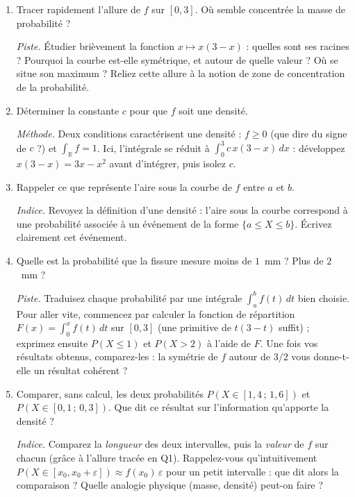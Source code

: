 \begin{enumerate}
  \item Tracer rapidement l'allure de $f$ sur $[0,3]$.
  Où semble concentrée la masse de probabilité ?
  \begin{solution}
    \textit{Piste.} Étudier brièvement la fonction $x\mapsto x(3-x)$ :
    quelles sont ses racines ? Pourquoi la courbe est-elle symétrique,
    et autour de quelle valeur ? Où se situe son maximum ?
    Reliez cette allure à la notion de \og zone de concentration \fg{}
    de la probabilité.
  \end{solution}

  \item Déterminer la constante $c$ pour que $f$ soit une densité.
  \begin{solution}
    \textit{Méthode.} Deux conditions caractérisent une densité :
    $f\ge 0$ (que dire du signe de $c$ ?) et
    $\int_{\mathbb R}f=1$. Ici, l'intégrale se réduit à
    $\int_0^3 c\,x(3-x)\,dx$ : développez $x(3-x)=3x-x^2$ avant
    d'intégrer, puis isolez $c$.
  \end{solution}

  \item Rappeler ce que représente l'aire sous
  la courbe de $f$ entre $a$ et $b$.
  \begin{solution}
    \textit{Indice.} Revoyez la définition d'une densité : l'aire
    sous la courbe correspond à une probabilité associée à un
    événement de la forme $\{a\le X\le b\}$. Écrivez clairement
    cet événement.
  \end{solution}

  \item Quelle est la probabilité que la fissure mesure moins
  de $1$~mm ? Plus de $2$~mm ?
  \begin{solution}
    \textit{Piste.} Traduisez chaque probabilité par une intégrale
    $\int_a^b f(t)\,dt$ bien choisie. Pour aller vite, commencez
    par calculer la fonction de répartition
    $F(x)=\int_0^x f(t)\,dt$ sur $[0,3]$ (une primitive de
    $t(3-t)$ suffit) ; exprimez ensuite $P(X\le 1)$ et $P(X>2)$
    à l'aide de $F$. Une fois vos résultats obtenus, comparez-les :
    la symétrie de $f$ autour de $3/2$ vous donne-t-elle un résultat
    cohérent ?
  \end{solution}

  \item Comparer, sans calcul, les deux probabilités
  $P(X\in[1{,}4\,;\,1{,}6])$ et $P(X\in[0{,}1\,;\,0{,}3])$.
  Que dit ce résultat sur l'information qu'apporte la densité ?
  \begin{solution}
    \textit{Indice.} Comparez la \emph{longueur} des deux intervalles,
    puis la \emph{valeur} de $f$ sur chacun (grâce à l'allure
    tracée en Q1). Rappelez-vous qu'intuitivement
    $P(X\in[x_0,x_0+\varepsilon])\approx f(x_0)\,\varepsilon$ pour
    un petit intervalle : que dit alors la comparaison ?
    Quelle analogie physique (masse, densité) peut-on faire ?
  \end{solution}


\end{enumerate}
